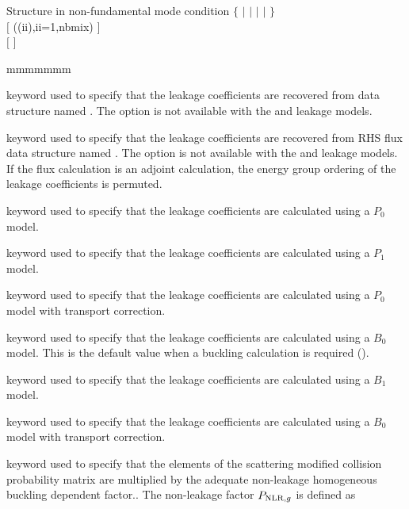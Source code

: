 \begin{DataStructure}{Structure  in non-fundamental mode condition}
$\{$  $|$  $|$  $|$  $|$  $\}$ \\
$[$  ((ii),ii=1,nbmix) $]$ \\
$[$   $]$
\end{DataStructure}

\begin{ListeDeDescription}{mmmmmmm}

\item[\moc{LKRD}] keyword used to specify that the leakage coefficients are
recovered from data structure named . The  option is not
available with the  and  leakage models.

\item[\moc{RHS}] keyword used to specify that the leakage coefficients are
recovered from RHS flux data structure named . The  option is not
available with the  and  leakage models. If the flux calculation is
an adjoint calculation, the energy group ordering of the leakage coefficients is permuted.

\item[\moc{P0}] keyword used to specify that the leakage coefficients are
calculated using a $P_0$ model.

\item[\moc{P1}] keyword used to specify that the leakage coefficients are
calculated using a $P_1$ model. 

\item[\moc{P0TR}] keyword used to specify that the leakage coefficients are
calculated using a $P_0$ model with transport correction.

\item[\moc{B0}] keyword used to specify that the leakage coefficients are
calculated using a $B_0$ model. This is the default value when a buckling
calculation is required ().

\item[\moc{B1}] keyword used to specify that the leakage coefficients are
calculated using a $B_1$ model.

\item[\moc{B0TR}] keyword used to specify that the leakage coefficients are
calculated using a $B_0$ model with transport correction.

\item[\moc{PNLR}] keyword used to specify that the elements of the scattering
modified collision probability matrix
are multiplied by the adequate non-leakage homogeneous buckling dependent
factor.\cite{ALSB1}. The non-leakage
factor $P_{{\rm NLR},g}$ is defined as


\end{ListeDeDescription}
